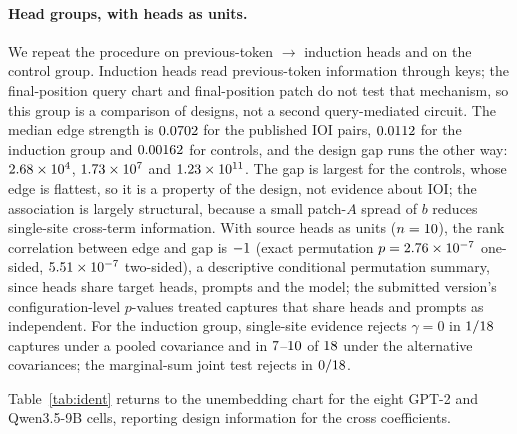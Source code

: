 \paragraph{Head groups, with heads as units.} We repeat the procedure on previous-token $\to$ induction heads and on
the control group. Induction heads read previous-token information through keys; the final-position query chart and final-position patch do not test that
mechanism, so this group is a comparison of designs, not a second query-mediated circuit. The median edge strength is $0.0702$ for the published IOI pairs, $0.0112$ for the
induction group and $0.00162$ for controls, and the design gap runs the other way: $2.68\times10^{4}$,
$1.73\times10^{7}$ and $1.23\times10^{11}$. The gap is largest for the controls, whose edge is flattest, so it is a
property of the design, not evidence about IOI; the association is largely structural, because a small patch-$A$
spread of $b$ reduces single-site cross-term information. With source heads as units ($n=10$), the rank
correlation between edge and gap is $-1$ (exact permutation $p=2.76\times10^{-7}$ one-sided, $5.51\times10^{-7}$ two-sided), a
descriptive conditional permutation summary, since heads share target heads, prompts and the model; the submitted
version's configuration-level $p$-values treated captures that share heads and prompts as independent. For the induction group,
single-site evidence rejects $\gamma=0$ in $1/18$ captures under a pooled covariance and in
$7$--$10$ of $18$ under the alternative covariances; the marginal-sum joint test rejects in
$0/18$. 

Table~\ref{tab:ident} returns to the unembedding chart for the eight GPT-2 and Qwen3.5-9B cells,
reporting design information for the cross coefficients.

